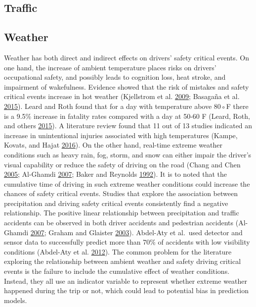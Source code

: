 \documentclass[12pt]{book}
\numberwithin{equation}{chapter}
\begin{document}
\hypertarget{traffic}{%
\subsection{Traffic}\label{traffic}}

\hypertarget{weather}{%
\subsection{Weather}\label{weather}}

Weather has both direct and indirect effects on drivers' safety critical events. On one hand, the increase of ambient temperature places risks on drivers' occupational safety, and possibly leads to cognition loss, heat stroke, and impairment of wakefulness. Evidence showed that the risk of mistakes and safety critical events increase in hot weather (Kjellstrom et al. \protect\hyperlink{ref-kjellstrom2009direct}{2009}; Basagaña et al. \protect\hyperlink{ref-basagana2015high}{2015}). Leard and Roth found that for a day with temperature above 80◦F there is a 9.5\% increase in fatality rates compared with a day at 50-60 F (Leard, Roth, and others \protect\hyperlink{ref-leard2015weather}{2015}). A literature review found that 11 out of 13 studies indicated an increase in unintentional injuries associated with high temperatures (Kampe, Kovats, and Hajat \protect\hyperlink{ref-im2016impact}{2016}). On the other hand, real-time extreme weather conditions such as heavy rain, fog, storm, and snow can either impair the driver's visual capability or reduce the safety of driving on the road (Chang and Chen \protect\hyperlink{ref-chang2005data}{2005}; Al-Ghamdi \protect\hyperlink{ref-al2007experimental}{2007}; Baker and Reynolds \protect\hyperlink{ref-baker1992wind}{1992}). It is to noted that the cumulative time of driving in such extreme weather conditions could increase the chances of safety critical events. Studies that explore the association between precipitation and driving safety critical events consistently find a negative relationship. The positive linear relationship between precipitation and traffic accidents can be observed in both driver accidents and pedestrian accidents (Al-Ghamdi \protect\hyperlink{ref-al2007experimental}{2007}; Graham and Glaister \protect\hyperlink{ref-graham2003spatial}{2003}). Abdel-Aty et al.~used detector and sensor data to successfully predict more than 70\% of accidents with low visibility conditions (Abdel-Aty et al. \protect\hyperlink{ref-abdel2012real}{2012}). The common problem for the literature exploring the relationship between ambient weather and safety driving critical events is the failure to include the cumulative effect of weather conditions. Instead, they all use an indicator variable to represent whether extreme weather happened during the trip or not, which could lead to potential bias in prediction models.
\end{document}
